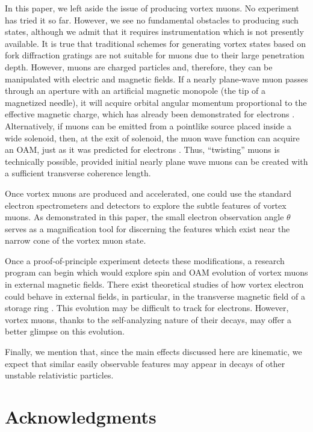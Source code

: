 \documentclass[aps,prd,longbibliography,nofootinbib,amsthm,amsmath,amssymb,amsfonts,notitlepage]{revtex4-1}
\begin{document}
In this paper, we left aside the issue of producing vortex muons.
No experiment has tried it so far. However, we see no fundamental obstacles to producing such states,
although we admit that it requires instrumentation which is not presently available.
It is true that traditional schemes for generating vortex states based on fork diffraction gratings
are not suitable for muons due to their large penetration depth. However, muons are charged particles
and, therefore, they can be manipulated with electric and magnetic fields.
If a nearly plane-wave muon passes through an aperture with an artificial magnetic monopole
(the tip of a magnetized needle), it will acquire orbital angular momentum proportional to the effective magnetic charge,
which has already been demonstrated for electrons \cite{Beche:2014}.
Alternatively, if muons can be emitted from a pointlike source placed inside a wide solenoid,
then, at the exit of solenoid, the muon wave function can acquire an OAM, just as it was predicted 
for electrons \cite{Floettmann:2020uhc,Karlovets:2020tlg}.
Thus, ``twisting'' muons is technically possible, provided initial nearly plane wave muons can be created
with a sufficient transverse coherence length.

Once vortex muons are produced and accelerated, one could use the standard electron spectrometers and detectors
to explore the subtle features of vortex muons.
As demonstrated in this paper, the small electron observation angle $\theta$ serves as a magnification tool
for discerning the features which exist near the narrow cone of the vortex muon state.

Once a proof-of-principle experiment detects these modifications, a research program can begin
which would explore spin and OAM evolution of vortex muons in external magnetic fields.
There exist theoretical studies of how vortex electron could behave in external fields, in particular, 
in the transverse magnetic field of a storage ring \cite{Gallatin:2012ai}.
This evolution may be difficult to track for electrons.
However, vortex muons, thanks to the self-analyzing nature of their decays, may offer a better glimpse
on this evolution.

Finally, we mention that, since the main effects discussed here are kinematic, 
we expect that similar easily observable features may appear
in decays of other unstable relativistic particles.


\section*{Acknowledgments}
\end{document}
